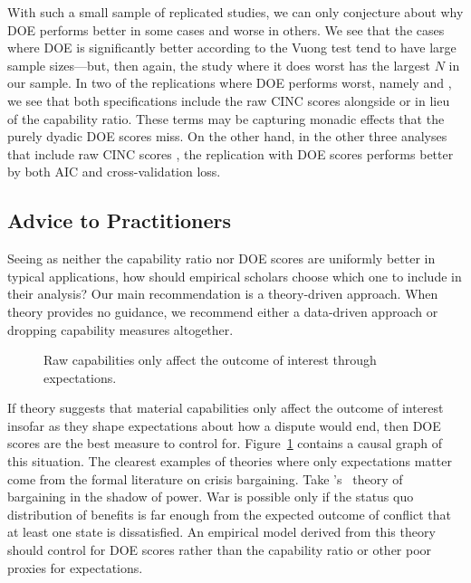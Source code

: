 With such a small sample of replicated studies, we can only conjecture about why DOE performs better in some cases and worse in others.
We see that the cases where DOE is significantly better according to the Vuong test tend to have large sample sizes---but, then again, the study where it does worst has the largest $N$ in our sample.
In two of the replications where DOE performs worst, namely \citet{Bennett:2006gp} and \citet{Fordham:2008gs}, we see that both specifications include the raw CINC scores alongside or in lieu of the capability ratio.
These terms may be capturing monadic effects that the purely dyadic DOE scores miss.
On the other hand, in the other three analyses that include raw CINC scores \citep{Arena:2009gk,Zawahri:2011iy,Weeks:2012be}, the replication with DOE scores performs better by both AIC and cross-validation loss.

\subsection{Advice to Practitioners}

Seeing as neither the capability ratio nor DOE scores are uniformly better in typical applications, how should empirical scholars choose which one to include in their analysis?
Our main recommendation is a theory-driven approach.
When theory provides no guidance, we recommend either a data-driven approach or dropping capability measures altogether.

\begin{figure}[htp]
  \centering
  
  \caption{
    Raw capabilities only affect the outcome of interest through expectations.
  }
  \label{fig:dag-cap0-doe1}
\end{figure}

If theory suggests that material capabilities only affect the outcome of interest insofar as they shape expectations about how a dispute would end, then DOE scores are the best measure to control for.
Figure~\ref{fig:dag-cap0-doe1} contains a causal graph of this situation.
The clearest examples of theories where only expectations matter come from the formal literature on crisis bargaining.
Take \citeauthor{powell1999}'s~\citeyearpar{powell1999} theory of bargaining in the shadow of power.
War is possible only if the status quo distribution of benefits is far enough from the expected outcome of conflict that at least one state is dissatisfied.
An empirical model derived from this theory should control for DOE scores rather than the capability ratio or other poor proxies for expectations.


